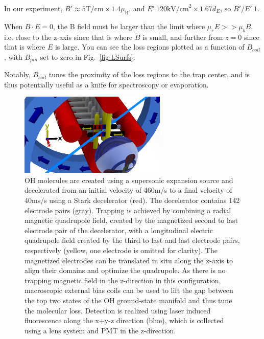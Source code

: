 \documentclass[%
 reprint,
 amsmath,amssymb,
 aps,
prl,
]{revtex4-1}
\begin{document}
In our experiment, $B' \approx 5 \text{T/cm} \times 1.4\mu_\text{B}$, and $E' ~ 120 \text{kV/cm}^2 \times 1.67 d_E$, so $B'/E' ~ 1$. 

When $B\cdot E = 0$, the B field must be larger than the limit where $\mu_eE >> \mu_b B$, i.e. close to the z-axis since that is where $B$ is small, and further from $z=0$ since that is where $E$ is large. You can see the loss regions plotted as a function of $B_{coil}$, with $B_{pin}$ set to zero in Fig.~\ref{fig:LSurfs}.

Notably, $B_{coil}$ tunes the proximity of the loss regions to the trap center, and is thus potentially useful as a knife for spectroscopy or evaporation.

\begin{figure}[b]
\includegraphics[width=70mm]{blue-red-yellow-v2_CAD.png}%
\caption{
OH molecules are created using a supersonic expansion source and decelerated from an initial velocity of 460m/s to a final velocity of 40ms/s using a Stark decelerator (red). The decelerator contains 142 electrode pairs (gray). Trapping is achieved by combining a radial magnetic quadrupole field, created by the magnetized second to last electrode pair of the decelerator, with a longitudinal electric quadrupole field created by the third to last and last electrode pairs, respectively (yellow, one electrode is omitted for clarity). The magnetized electrodes can be translated in situ along the x-axis to align their domains and optimize the quadrupole. As there is no trapping magnetic field in the z-direction in this configuration, macroscopic external bias coils can be used to lift the gap between the top two states of the OH ground-state manifold and thus tune the molecular loss. Detection is realized using laser induced fluorescence along the x+y-z direction (blue), which is collected using a lens system and PMT in the z-direction.
\label{fig:CAD}}
\end{figure}
\end{document}
